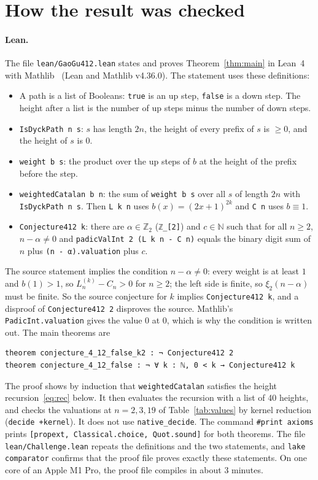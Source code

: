 \documentclass[11pt]{article}
\theoremstyle{remark}
\newcommand{\Z}{\mathbb{Z}}
\begin{document}
\section{How the result was checked}\label{sec:check}

\paragraph{Lean.} The file \texttt{lean/GaoGu412.lean} states and proves Theorem~\ref{thm:main} in Lean~4 with Mathlib~\cite{Lean,Mathlib} (Lean and Mathlib v4.36.0). The statement uses these definitions:
\begin{itemize}
\item A path is a list of Booleans: \texttt{true} is an up step, \texttt{false} is a down step. The height after a list is the number of up steps minus the number of down steps.
\item \texttt{IsDyckPath n s}: $s$ has length $2n$, the height of every prefix of $s$ is $\ge 0$, and the height of $s$ is $0$.
\item \texttt{weight b s}: the product over the up steps of $b$ at the height of the prefix before the step.
\item \texttt{weightedCatalan b n}: the sum of \texttt{weight b s} over all $s$ of length $2n$ with \texttt{IsDyckPath n s}. Then \texttt{L k n} uses $b(x)=(2x+1)^{2k}$ and \texttt{C n} uses $b\equiv1$.
\item \texttt{Conjecture412 k}: there are $\alpha\in\Z_2$ (\texttt{ℤ\_[2]}) and $c\in\mathbb N$ such that for all $n\ge 2$, $n-\alpha\ne 0$ and \texttt{padicValInt 2 (L k n - C n)} equals the binary digit sum of $n$ plus \texttt{(n - α).valuation} plus $c$.
\end{itemize}
The source statement implies the condition $n-\alpha\neq0$: every weight is at least $1$ and $b(1)>1$, so $L^{(k)}_n-C_n>0$ for $n\ge2$; the left side is finite, so $\xi_2(n-\alpha)$ must be finite. So the source conjecture for $k$ implies \texttt{Conjecture412 k}, and a disproof of \texttt{Conjecture412 2} disproves the source. Mathlib's \texttt{PadicInt.valuation} gives the value $0$ at $0$, which is why the condition is written out. The main theorems are
\begin{Verbatim}[fontsize=\small]
theorem conjecture_4_12_false_k2 : ¬ Conjecture412 2
theorem conjecture_4_12_false : ¬ ∀ k : ℕ, 0 < k → Conjecture412 k
\end{Verbatim}
The proof shows by induction that \texttt{weightedCatalan} satisfies the height recursion~\eqref{eq:rec} below. It then evaluates the recursion with a list of 40 heights, and checks the valuations at $n=2,3,19$ of Table~\ref{tab:values} by kernel reduction (\texttt{decide +kernel}). It does not use \texttt{native\_decide}. The command \texttt{\#print axioms} prints \texttt{[propext, Classical.choice, Quot.sound]} for both theorems. The file \texttt{lean/Challenge.lean} repeats the definitions and the two statements, and \texttt{lake comparator} confirms that the proof file proves exactly these statements. On one core of an Apple M1 Pro, the proof file compiles in about 3 minutes.
\end{document}
